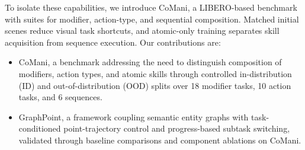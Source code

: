 To isolate these capabilities, we introduce CoMani, a LIBERO-based benchmark~\cite{liu2023libero} with suites for modifier, action-type, and sequential composition.
Matched initial scenes reduce visual task shortcuts, and atomic-only training separates skill acquisition from sequence execution.
Our contributions are:
\begin{itemize}
    \item CoMani, a benchmark addressing the need to distinguish composition of modifiers, action types, and atomic skills through controlled in-distribution (ID) and out-of-distribution (OOD) splits over 18 modifier tasks, 10 action tasks, and 6 sequences.
    \item GraphPoint, a framework coupling semantic entity graphs with task-conditioned point-trajectory control and progress-based subtask switching, validated through baseline comparisons and component ablations on CoMani.
\end{itemize}

